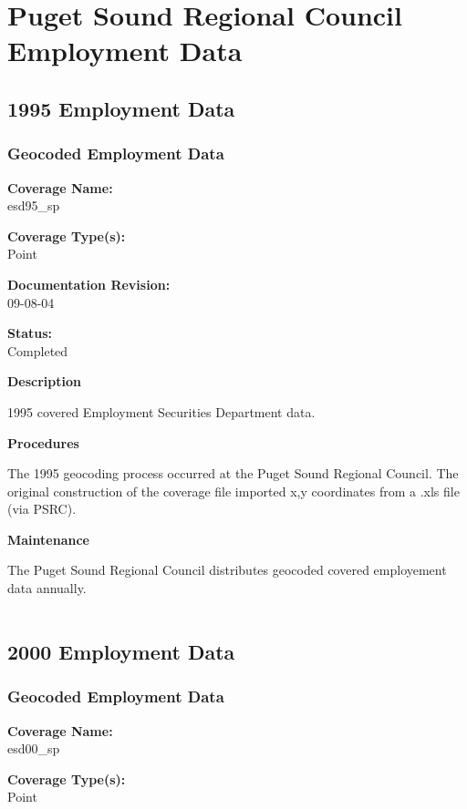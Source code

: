 \chapter{Puget Sound Regional Council Employment Data}
\section{1995 Employment Data}
\subsection{Geocoded Employment Data}
{\bf \large Coverage Name:}\\
esd95\_sp

{\bf \large Coverage Type(s):}\\
Point

{\bf \large Documentation Revision:}\\
09-08-04

{\bf \large Status:}\\
Completed

{\bf \large Description}

1995 covered Employment Securities Department data.

{\bf \large Procedures}

The 1995 geocoding process occurred at the Puget Sound Regional
Council. The original construction of the coverage file imported
x,y coordinates from a .xls file (via PSRC).

{\bf \large Maintenance}

The Puget Sound Regional Council distributes geocoded covered
employement data annually.

\begin{landscape}
\begin{longtable}{llrrrrrc}

\end{longtable}
\end{landscape}
\newpage

\section{2000 Employment Data}
\subsection{Geocoded Employment Data}
{\bf \large Coverage Name:}\\
esd00\_sp

{\bf \large Coverage Type(s):}\\
Point


